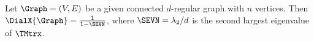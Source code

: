 \begin{lemma}
    Let $\Graph=(V,E)$ be a given connected $d$-regular graph with $n$
    vertices. Then $\DialX{\Graph} = \frac{1}{1-\SEVN}$, where
    $\SEVN=\lambda_2/d$ is the second largest eigenvalue of $\TMtrx$.

\end{lemma}
